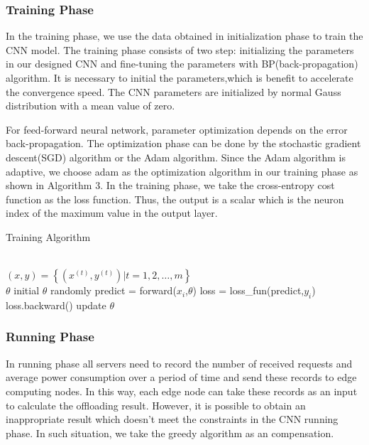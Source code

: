 \documentclass[twoside,twocolumn]{article}
\begin{document}
\subsubsection{Training Phase}
In the training phase, we use the data obtained in initialization phase to train the CNN model. The training phase consists of two step: initializing the parameters in our designed CNN and fine-tuning the parameters with BP(back-propagation) algorithm. It is necessary to initial the parameters,which is benefit to accelerate the convergence speed. The CNN parameters are initialized by normal Gauss distribution with a mean value of zero. 

For feed-forward neural network, parameter optimization depends on the error back-propagation. The optimization phase can be done by the stochastic gradient descent(SGD) algorithm or the Adam algorithm. Since the Adam algorithm is adaptive, we choose adam as the optimization algorithm in our training phase as shown in Algorithm 3. In the training phase, we take the cross-entropy cost function as the loss function. Thus, the output is a scalar which is the neuron index of the maximum value in the output layer.
\begin{algorithm}[!h]   
\caption{Training Algorithm}   
\label{alg:Framwork}   
\begin{algorithmic}[1]
\REQUIRE ~~\\
$(x,y)= \left\{(x^{(t)},y^{(t)})|t=1,2,\dots,m \right\}$
\ENSURE  ~~\\
$\theta$
\STATE initial $\theta$ randomly
\STATE predict = forward($x_i$,$\theta$)
\STATE loss = loss\_fun(predict,$y_i$)
\STATE loss.backward()
\STATE update $\theta$
\ENDFOR
\end{algorithmic}  
\end{algorithm} 

\subsubsection{Running Phase} 
In running phase all servers need to record the number of received requests and average power consumption over a period of time and send these records to edge computing nodes. In this way, each edge node can take these records as an input to calculate the offloading result. However, it is possible to obtain an inappropriate result which doesn't meet the constraints in the CNN running phase. In such situation, we take the greedy algorithm as an compensation.
\end{document}
